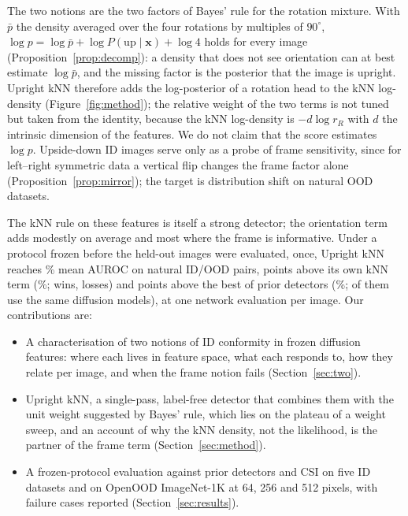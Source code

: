 \documentclass{article}
\newcommand{\up}{\mathrm{up}}
\begin{document}
The two notions are the two factors of Bayes' rule for the rotation mixture. With $\bar p$ the density averaged over the four rotations by multiples of $90^\circ$, $\log p=\log\bar p+\log P(\up\mid\mathbf{x})+\log 4$ holds for every image (Proposition~\ref{prop:decomp}): a density that does not see orientation can at best estimate $\log\bar p$, and the missing factor is the posterior that the image is upright. Upright kNN therefore adds the log-posterior of a rotation head to the kNN log-density (Figure~\ref{fig:method}); the relative weight of the two terms is not tuned but taken from the identity, because the kNN log-density is $-d\log r_R$ with $d$ the intrinsic dimension of the features. We do not claim that the score estimates $\log p$. Upside-down ID images serve only as a probe of frame sensitivity, since for left--right symmetric data a vertical flip changes the frame factor alone (Proposition~\ref{prop:mirror}); the target is distribution shift on natural OOD datasets.

The kNN rule on these features is itself a strong detector; the orientation term adds modestly on average and most where the frame is informative. Under a protocol frozen before the held-out images were evaluated, once, Upright kNN reaches \oursMean\% mean AUROC on \nNatPairsMain{} natural ID/OOD pairs, \gainKnnTNat{} points above its own kNN term (\contentMean\%; \winKnnTNat{} wins, \lossKnnTNat{} losses) and \priorGap{} points above the best of \nPrior{} prior detectors (\bestPriorMean\%; \nPriorModelWord{} of them use the same diffusion models), at one network evaluation per image. Our contributions are:
\begin{itemize}\setlength{\itemsep}{0pt}
\item A characterisation of two notions of ID conformity in frozen diffusion features: where each lives in feature space, what each responds to, how they relate per image, and when the frame notion fails (Section~\ref{sec:two}).
\item Upright kNN, a single-pass, label-free detector that combines them with the unit weight suggested by Bayes' rule, which lies on the plateau of a weight sweep, and an account of why the kNN density, not the likelihood, is the partner of the frame term (Section~\ref{sec:method}).
\item A frozen-protocol evaluation against \nPrior{} prior detectors and CSI on five ID datasets and on OpenOOD ImageNet-1K at 64, 256 and 512 pixels, with failure cases reported (Section~\ref{sec:results}).
\end{itemize}
\end{document}
